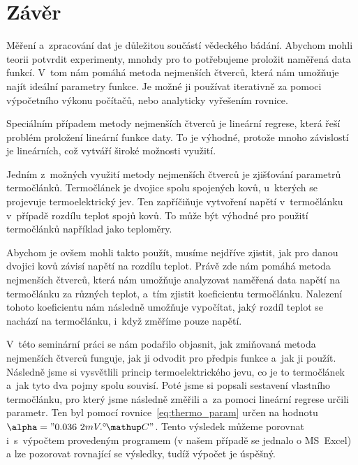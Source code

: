 \section{Závěr}
Měření a~zpracování dat je důležitou součástí vědeckého bádání. Abychom mohli
teorii potvrdit experimenty, mnohdy pro to potřebujeme proložit naměřená data
funkcí. V~tom nám pomáhá metoda nejmenších čtverců, která nám umožňuje najít
ideální parametry funkce. Je možné ji používat iterativně za pomoci výpočetního
výkonu počítačů, nebo analyticky vyřešením rovnice.

Speciálním případem metody nejmenších čtverců je lineární regrese, která řeší
problém proložení lineární funkce daty. To je výhodné, protože mnoho závislostí
je lineárních, což vytváří široké možnosti využití.

Jedním z~možných využití metody nejmenších čtverců je zjišťování parametrů
termočlánků. Termočlánek je dvojice spolu spojených kovů, u~kterých se
projevuje termoelektrický jev. Ten zapříčiňuje vytvoření napětí v~termočlánku
v~případě rozdílu teplot spojů kovů. To může být výhodné pro použití
termočlánků například jako teploměry. 

Abychom je ovšem mohli takto použít, musíme nejdříve zjistit, jak pro danou
dvojici kovů závisí napětí na rozdílu teplot. Právě zde nám pomáhá metoda
nejmenších čtverců, která nám umožňuje analyzovat naměřená data napětí na
termočlánku za různých teplot, a~tím zjistit koeficientu termočlánku.
Nalezení tohoto koeficientu nám následně umožňuje vypočítat, jaký rozdíl teplot
se nachází na termočlánku, i~když změříme pouze napětí.

V~této seminární práci se nám podařilo objasnit, jak zmiňovaná metoda
nejmenších čtverců funguje, jak ji odvodit pro předpis funkce a~jak ji použít.
Následně jsme si vysvětlili princip termoelektrického jevu, co je to
termočlánek a~jak tyto dva pojmy spolu souvisí. Poté jsme si popsali sestavení
vlastního termočlánku, pro který jsme následně změřili a~za pomoci lineární
regrese určili parametr. Ten byl pomocí rovnice~\ref{eq:thermo_param} určen
na hodnotu $\alpha="0.036~2 mV.\C"$. Tento výsledek můžeme porovnat
i~s~výpočtem provedeným programem (v našem případě se jednalo o MS~Excel) a
lze pozorovat rovnající se výsledky, tudíž výpočet je úspěšný.

